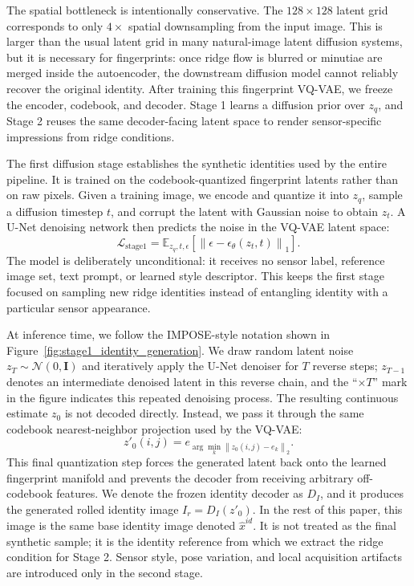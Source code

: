 \documentclass{article}
\begin{document}
The spatial bottleneck is intentionally conservative.  The $128 \times 128$
latent grid corresponds to only $4\times$ spatial downsampling from the input
image.  This is larger than the usual latent grid in many natural-image latent
diffusion systems, but it is necessary for fingerprints: once ridge flow is
blurred or minutiae are merged inside the autoencoder, the downstream diffusion
model cannot reliably recover the original identity.  After training this
fingerprint VQ-VAE, we freeze the encoder, codebook, and decoder.  Stage 1
learns a diffusion prior over $z_q$, and Stage 2 reuses the same decoder-facing
latent space to render sensor-specific impressions from ridge conditions.

The first diffusion stage establishes the synthetic identities used by the
entire pipeline.  It is trained on the codebook-quantized fingerprint latents
rather than on raw pixels.  Given a training image, we encode and quantize it
into $z_q$, sample a diffusion timestep $t$, and corrupt the latent with
Gaussian noise to obtain $z_t$.  A U-Net denoising network then predicts the
noise in the VQ-VAE latent space:
\[
    \mathcal{L}_{\text{stage1}} =
    \mathbb{E}_{z_q,t,\epsilon}
    \left[\left\|
        \epsilon - \epsilon_\theta(z_t,t)
    \right\|_1\right].
\]
The model is deliberately unconditional: it receives no sensor label, reference
image set, text prompt, or learned style descriptor.  This keeps the first
stage focused on sampling new ridge identities instead of entangling identity
with a particular sensor appearance.

At inference time, we follow the IMPOSE-style notation shown in
Figure~\ref{fig:stage1_identity_generation}.  We draw random latent noise
$z_T \sim \mathcal{N}(0,\mathbf{I})$ and iteratively apply the U-Net denoiser
for $T$ reverse steps; $z_{T-1}$ denotes an intermediate denoised latent in this
reverse chain, and the ``$\times T$'' mark in the figure indicates this
repeated denoising process.  The resulting continuous estimate $z_0$ is not
decoded directly.  Instead, we pass it through the same codebook
nearest-neighbor projection used by the VQ-VAE:
\[
    z'_0(i,j)=
    e_{\arg\min_k \left\|z_0(i,j)-e_k\right\|_2}.
\]
This final quantization step forces the generated latent back onto the learned
fingerprint manifold and prevents the decoder from receiving arbitrary
off-codebook features.  We denote the frozen identity decoder as $D_I$, and it
produces the generated rolled identity image $I_r=D_I(z'_0)$.  In the rest of
this paper, this image is the same base identity image denoted
$\hat{x}^{id}$.  It is not treated as the final synthetic sample; it is the
identity reference from which we extract the ridge condition for Stage 2.
Sensor style, pose variation, and local acquisition artifacts are introduced
only in the second stage.
\end{document}
